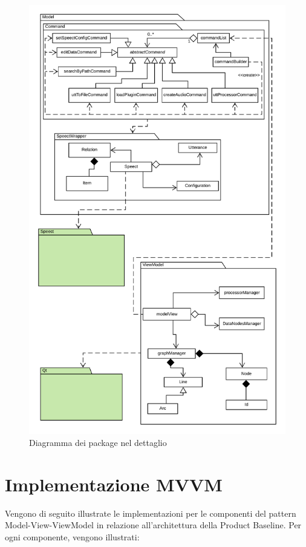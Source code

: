 \documentclass[openany,12pt,a4paper]{report}
\begin{document}
\begin{figure}[H]
	\includegraphics[scale=0.63]{PackageDiagram2}
	\centering
	\caption{Diagramma dei package nel dettaglio}
\end{figure}

\chapter{Implementazione MVVM}

Vengono di seguito illustrate le implementazioni per le componenti del pattern Model-View-ViewModel in relazione all'architettura della Product Baseline. Per ogni componente, vengono illustrati:
\end{document}

